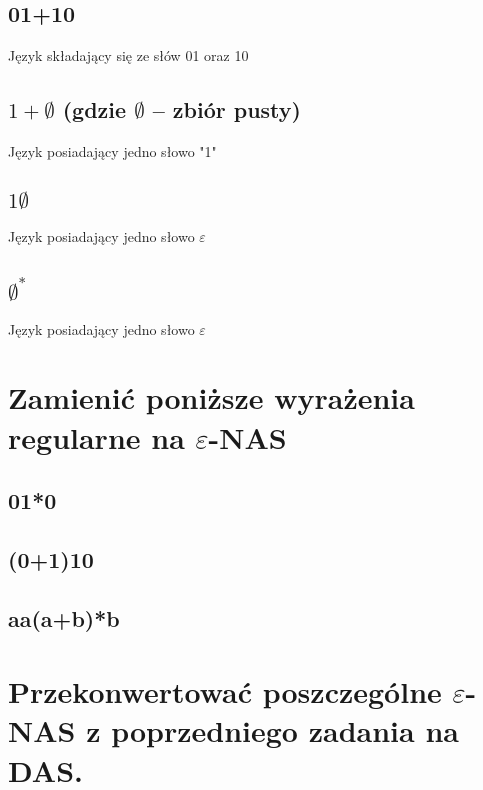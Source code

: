 \documentclass[a4paper,11pt]{article}
\begin{document}
\subsection{01+10}
Język składający się ze słów 01 oraz 10
\subsection{$1+\emptyset$ (gdzie $\emptyset$ – zbiór pusty)}
Język posiadający jedno słowo "1"
\subsection{$1\emptyset$}
Język posiadający jedno słowo $\varepsilon$
\subsection{$\emptyset^*$}
Język posiadający jedno słowo $\varepsilon$


\newpage
\section{Zamienić poniższe wyrażenia regularne na $\varepsilon$-NAS}
\subsection{01*0}
\subsection{(0+1)10}
\subsection{aa(a+b)*b}

\section{Przekonwertować poszczególne $\varepsilon$-NAS z poprzedniego zadania na DAS.}
\end{document}
